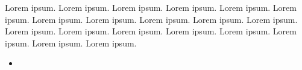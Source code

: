\documentclass[
]{book}
\providecommand{\tightlist}{%
  \setlength{\itemsep}{0pt}\setlength{\parskip}{0pt}}
\begin{document}
Lorem ipsum. Lorem ipsum. Lorem ipsum. Lorem ipsum. Lorem ipsum. Lorem ipsum. Lorem ipsum. Lorem ipsum. Lorem ipsum. Lorem ipsum. Lorem ipsum. Lorem ipsum. Lorem ipsum. Lorem ipsum. Lorem ipsum. Lorem ipsum. Lorem ipsum. Lorem ipsum. Lorem ipsum.

\begin{itemize}
\tightlist
\item
\end{itemize}

  
\end{document}
